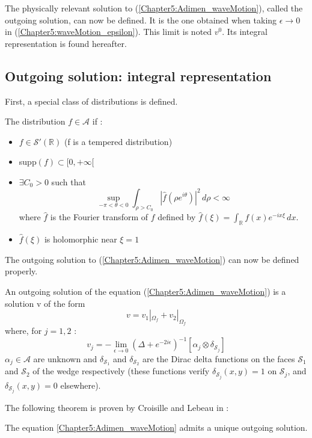 The physically relevant solution to (\ref{Chapter5:Adimen_waveMotion}), called the outgoing solution, can now be defined. It is the one obtained when taking $\epsilon \to 0$ in (\ref{Chapter5:waveMotion_epsilon}). This limit is noted $v^0$. Its integral representation is found hereafter.

\subsection{Outgoing solution: integral representation}
\label{integral_representation}

First, a special class of distributions is defined.
\begin{definition}
The distribution $f\in \mathcal{A}$ if :
\begin{itemize}
\item $f \in \mathcal{S}'(\mathbb{R})$ (f is a tempered distribution)
\item supp$(f) \subset \lbrack 0,+\infty \lbrack$
\item $\exists C_0>0$ such that
$$ \sup_{-\pi<\theta<0} \int_{\rho>C_0}|\hat{f}(\rho e^{i\theta})|^2\,d\rho <\infty$$
where $\hat{f}$ is the Fourier transform of $f$ defined by $\hat{f}(\xi)=\int_{\mathbb{R}}f(x)e^{-ix\xi}\, dx$.
\item $\hat{f}(\xi)$ is holomorphic near $\xi=1$
\end{itemize}
\label{defClassA}
\end{definition}
The outgoing solution to (\ref{Chapter5:Adimen_waveMotion}) can now be defined properly.

\begin{definition}
An outgoing solution of the equation (\ref{Chapter5:Adimen_waveMotion}) is a solution v of the form 
\begin{equation}
\label{Chapter5:decomposition}
v=v_1|_{\Omega_f}+v_2|_{\Omega_f}
\end{equation}
where, for $j=1,2$ :
\begin{equation}
\label{inv_potentiels}
v_j=-\lim_{\epsilon \to 0} \left(\Delta+e^{-2i\epsilon}\right)^{-1} \left[ \alpha_j \otimes \delta_{\mathcal{S}_j} \right]
\end{equation}
$\alpha_j \in \mathcal{A}$ are unknown and $\delta_{\mathcal{S}_1}$ and $\delta_{\mathcal{S}_2}$ are the Dirac delta functions on the faces $\mathcal{S}_1$ and $\mathcal{S}_2$ of the wedge respectively (these functions verify $\delta_{\mathcal{S}_j}(x,y)=1$ on $\mathcal{S}_j$, and $\delta_{\mathcal{S}_j}(x,y)=0$ elsewhere).

\end{definition}
The following theorem is proven by Croisille and Lebeau in \cite{CroisilleLebeau} :
\begin{theorem}
The equation \eqref{Chapter5:Adimen_waveMotion} admits a unique outgoing solution.
\end{theorem}

